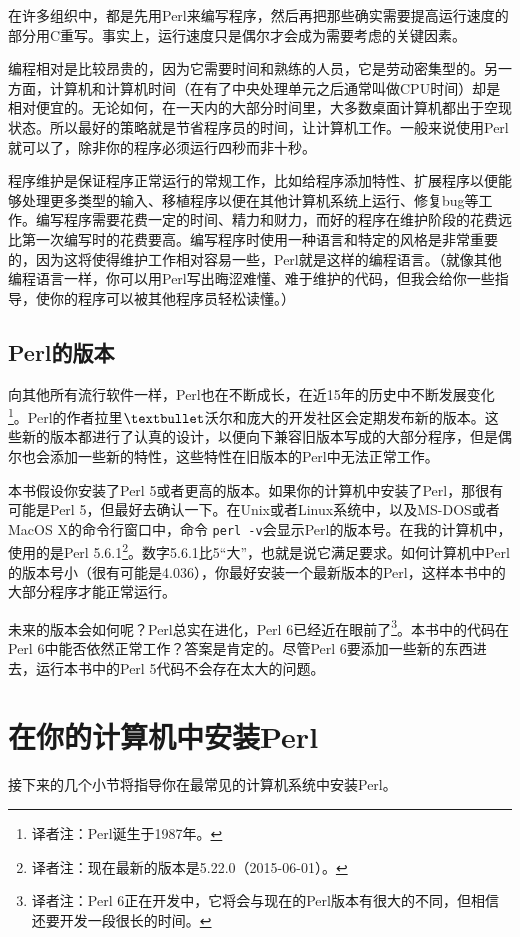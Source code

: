 在许多组织中，都是先用Perl来编写程序，然后再把那些确实需要提高运行速度的部分用C重写。事实上，运行速度只是偶尔才会成为需要考虑的关键因素。

编程相对是比较昂贵的，因为它需要时间和熟练的人员，它是劳动密集型的。另一方面，计算机和计算机时间（在有了中央处理单元之后通常叫做CPU时间）却是相对便宜的。无论如何，在一天内的大部分时间里，大多数桌面计算机都出于空现状态。所以最好的策略就是节省程序员的时间，让计算机工作。一般来说使用Perl就可以了，除非你的程序必须运行四秒而非十秒。

程序维护是保证程序正常运行的常规工作，比如给程序添加特性、扩展程序以便能够处理更多类型的输入、移植程序以便在其他计算机系统上运行、修复bug等工作。编写程序需要花费一定的时间、精力和财力，而好的程序在维护阶段的花费远比第一次编写时的花费要高。编写程序时使用一种语言和特定的风格是非常重要的，因为这将使得维护工作相对容易一些，Perl就是这样的编程语言。（就像其他编程语言一样，你可以用Perl写出晦涩难懂、难于维护的代码，但我会给你一些指导，使你的程序可以被其他程序员轻松读懂。）

\subsection{Perl的版本}
向其他所有流行软件一样，Perl也在不断成长，在近15年的历史中不断发展变化\footnote{译者注：Perl诞生于1987年。}。Perl的作者拉里$\textbullet$沃尔和庞大的开发社区会定期发布新的版本。这些新的版本都进行了认真的设计，以便向下兼容旧版本写成的大部分程序，但是偶尔也会添加一些新的特性，这些特性在旧版本的Perl中无法正常工作。

本书假设你安装了Perl 5或者更高的版本。如果你的计算机中安装了Perl，那很有可能是Perl 5，但最好去确认一下。在Unix或者Linux系统中，以及MS-DOS或者MacOS X的命令行窗口中，命令 \verb|perl -v|会显示Perl的版本号。在我的计算机中，使用的是Perl 5.6.1\footnote{译者注：现在最新的版本是5.22.0（2015-06-01）。}。数字5.6.1比5“大”，也就是说它满足要求。如何计算机中Perl的版本号小（很有可能是4.036），你最好安装一个最新版本的Perl，这样本书中的大部分程序才能正常运行。

未来的版本会如何呢？Perl总实在进化，Perl 6已经近在眼前了\footnote{译者注：Perl 6正在开发中，它将会与现在的Perl版本有很大的不同，但相信还要开发一段很长的时间。}。本书中的代码在Perl 6中能否依然正常工作？答案是肯定的。尽管Perl 6要添加一些新的东西进去，运行本书中的Perl 5代码不会存在太大的问题。

\section{在你的计算机中安装Perl}
接下来的几个小节将指导你在最常见的计算机系统中安装Perl。

